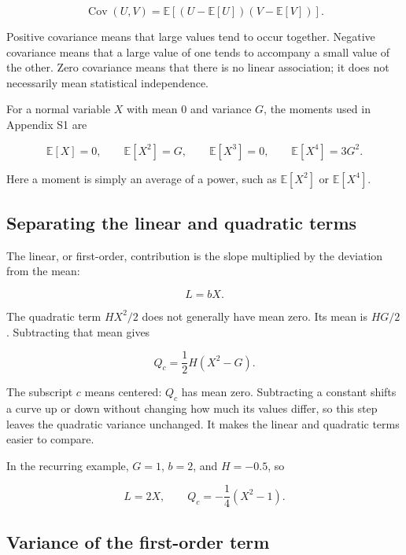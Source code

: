 \documentclass[11pt]{article}
\newcommand{\E}{\mathbb{E}}
\newcommand{\Cov}{\operatorname{Cov}}
\begin{document}
\begin{equation}
\Cov(U,V)=\E[(U-\E[U])(V-\E[V])].
\end{equation}

Positive covariance means that large values tend to occur together.  Negative
covariance means that a large value of one tends to accompany a small value of
the other.  Zero covariance means that there is no linear association; it does
not necessarily mean statistical independence.

For a normal variable $X$ with mean 0 and variance $G$, the moments used in
Appendix S1 are

\begin{equation}
\E[X]=0,\qquad \E[X^2]=G,\qquad \E[X^3]=0,
\qquad \E[X^4]=3G^2.
\label{eq:guide-normal-moments}
\end{equation}

Here a moment is simply an average of a power, such as $\E[X^2]$ or
$\E[X^4]$.

\subsection{Separating the linear and quadratic terms}

The linear, or first-order, contribution is the slope multiplied by the deviation from the mean:

\begin{equation}
L=bX.
\end{equation}

The quadratic term $HX^2/2$ does not generally have mean zero.  Its mean is
$HG/2$.  Subtracting that mean gives

\begin{equation}
Q_c=\frac12H(X^2-G).
\label{eq:guide-centered-Q}
\end{equation}

The subscript $c$ means centered: $Q_c$ has mean zero. Subtracting a constant shifts a curve up or down without changing how much its values differ, so this step leaves the quadratic variance unchanged. It makes the linear and quadratic terms easier to compare.

In the recurring example, $G=1$, $b=2$, and $H=-0.5$, so

\begin{equation}
L=2X,\qquad Q_c=-\frac14(X^2-1).
\end{equation}

\subsection{Variance of the first-order term}
\end{document}
